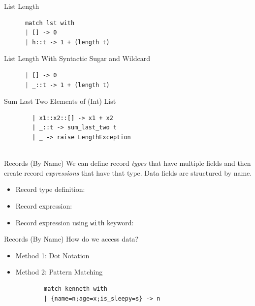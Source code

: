 \documentclass{beamer}
\begin{document}
    \begin{frame}[fragile]{List Length}
    \pause
    \begin{verbatim}
      match lst with
      | [] -> 0
      | h::t -> 1 + (length t)
    \end{verbatim}
    \end{frame}
    
    \begin{frame}[fragile]{List Length With Syntactic Sugar and Wildcard}
    \begin{verbatim}
      | [] -> 0
      | _::t -> 1 + (length t)
    \end{verbatim}
    \end{frame}
    
    \begin{frame}[fragile]{Sum Last Two Elements of (Int) List}
        \pause
        \begin{verbatim}
        | x1::x2::[] -> x1 + x2
        | _::t -> sum_last_two t
        | _ -> raise LengthException
        
        \end{verbatim}
    \end{frame}
    
    \begin{frame}{Records (By Name)}
    We can define record \textit{types} that have multiple fields and then create record \textit{expressions} that have that type. Data fields are structured by name. \pause
    
        \begin{itemize}
            \item Record type definition: 
            \pause
            
            \item Record expression:
            \pause
            
            \item Record expression using \texttt{with} keyword:
        \end{itemize}
    \end{frame}
    
    \begin{frame}[fragile]{Records (By Name)}
    How do we access data?
    \begin{itemize}
        \item Method 1: Dot Notation
        
        \item Method 2: Pattern Matching
        \begin{verbatim}
        match kenneth with
        | {name=n;age=x;is_sleepy=s} -> n
        \end{verbatim}
    \end{itemize}
    \end{frame}
    
\end{document}
